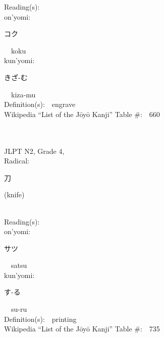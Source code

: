 \begin{multicols}{2}
Reading(s):\ \ \\
{\hspace*{1em}}on'yomi:\ \ \\
{\hspace*{2em}}{\begin{CJK}{UTF8}{min} コク \end{CJK}}\ \ koku\ \ \\
{\hspace*{1em}}kun'yomi:\ \ \\
{\hspace*{2em}}{\begin{CJK}{UTF8}{min} きざ-む \end{CJK}}\ \ kiza-mu\ \ \\
Definition(s):\ \ engrave \\
Wikipedia ``List of the J\=oy\=o Kanji'' Table \#:\ \ 660 \\
\ \ \\
{\fontsize{34pt}{40pt}  }\ \ \\  %
{JLPT N2, Grade 4, \\Radical:\ \ {\begin{CJK}{UTF8}{min} 刀 \end{CJK}} (knife) } \\
Reading(s):\ \ \\
{\hspace*{1em}}on'yomi:\ \ \\
{\hspace*{2em}}{\begin{CJK}{UTF8}{min} サツ \end{CJK}}\ \ satsu\ \ \\
{\hspace*{1em}}kun'yomi:\ \ \\
{\hspace*{2em}}{\begin{CJK}{UTF8}{min} す-る \end{CJK}}\ \ su-ru\ \ \\
Definition(s):\ \ printing \\
Wikipedia ``List of the J\=oy\=o Kanji'' Table \#:\ \ 735 \\
\ \ \\
{\fontsize{34pt}{40pt}  }\ \ \\  %

\end{multicols}
